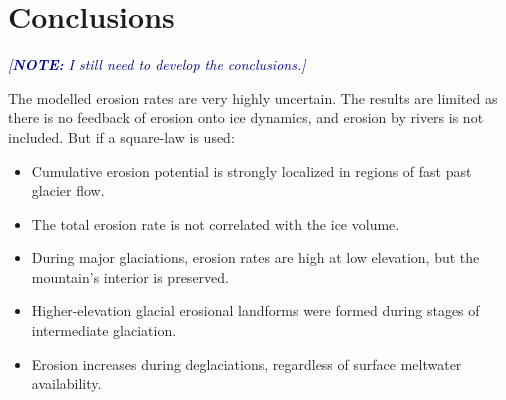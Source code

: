 \documentclass[utf8]{article}
\newcommand{\note}[1]{\textcolor{darkblue}{\emph{[\textbf{NOTE:} #1]}}}
\begin{document}
\section{Conclusions}

    \note{I still need to develop the conclusions.}

    The modelled erosion rates are very highly uncertain. The results are
    limited as there is no feedback of erosion onto ice dynamics, and
    erosion by rivers is not included. But if a square-law is used:
    \begin{itemize}
      \item Cumulative erosion potential is strongly localized in regions
        of fast past glacier flow.
      \item The total erosion rate is not correlated with the ice volume.
      \item During major glaciations, erosion rates are high at low elevation,
        but the mountain's interior is preserved.
      \item Higher-elevation glacial erosional landforms were formed during
        stages of intermediate glaciation.
      \item Erosion increases during deglaciations, regardless of surface
        meltwater availability.
    \end{itemize}


\end{document}

